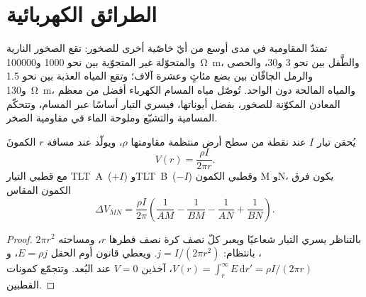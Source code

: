 \section{الطرائق الكهربائية}\label{sec:b3:field-lab-methods-3:electrical}

تمتدّ المقاومية في مدى أوسع من أيّ خاصّية أخرى للصخور:
تقع الصخور النارية والمتحوّلة غير المتجوّية بين نحو
\num{1000} و\qty{100000}{\ohm\metre}، والطَّفل بين نحو
\num{3} و\num{30}، والحصى والرمل الجافّان بين بضع مئاتٍ وعشرة
آلاف؛ وتقع المياه العذبة بين نحو \num{1.5}
و\qty{130}{\ohm\metre}، والمياه المالحة دون الواحد. تُوصّل مياه المسام
الكهرباء أفضل من معظم المعادن المكوّنة للصخور، بفضل أيوناتها، فيسري التيار
أساسًا عبر المسام، وتتحكّم المسامية والتشبّع
وملوحة الماء في مقاومية الصخر.

\begin{theorem}\label{thm:b3:field-lab-methods-3:point-source}
يُحقن تيار $I$ عند نقطة من سطح أرض منتظمة
مقاومتها $\rho$، ويولّد عند مسافة $r$ الكمونَ
\[
V(r) = \frac{\rho I}{2\pi r} .
\]
مع قطبي التيار \mbox{\textdir TLT A~($+I$)} و\mbox{\textdir TLT B~($-I$)} وقطبي الكمون
M وN، يكون فرق الكمون المقاس
\[
\Delta V_{MN} = \frac{\rho I}{2\pi}\left(\frac{1}{AM} - \frac{1}{BM}
               - \frac{1}{AN} + \frac{1}{BN}\right) .
\]
\end{theorem}

\begin{proof}
بالتناظر يسري التيار شعاعيًا ويعبر كلّ نصف كرة
نصف قطرها $r$، ومساحته $2\pi r^2$، بانتظام: $j = I/(2\pi r^2)$. ويعطي قانون أوم
الحقل $E = \rho j$، و$V(r) = \int_r^\infty E\,\mathrm{d}r'
= \rho I/(2\pi r)$، آخذين $V = 0$ عند البُعد. وتتجمّع كمونات
القطبين.
\end{proof}

